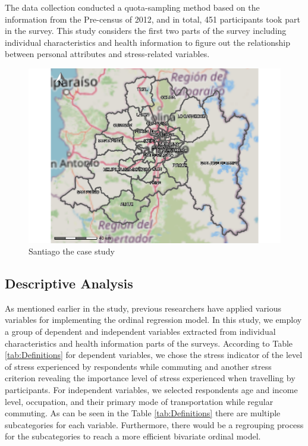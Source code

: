 \documentclass[
11pt, %
oneside, %
english, %
singlespacing, %
]{macthesis} %
\begin{document}
The data collection conducted a quota-sampling method based on the information from the Pre-census of 2012, and in total, 451 participants took part in the survey. This study considers the first two parts of the survey including individual characteristics and health information to figure out the relationship between personal attributes and stress-related variables.
\begin{figure}

{\centering \includegraphics[width=0.85\linewidth]{thesis_files/figure-latex/unnamed-chunk-21-1} 

}

\caption{\label{fig:study boundaries}Santiago the case study}\label{fig:unnamed-chunk-21}
\end{figure}
\hypertarget{descriptive-analysis}{%
\subsection{Descriptive Analysis}\label{descriptive-analysis}}

As mentioned earlier in the study, previous researchers have applied various variables for implementing the ordinal regression model. In this study, we employ a group of dependent and independent variables extracted from individual characteristics and health information parts of the surveys. According to Table \ref{tab:Definitions} for dependent variables, we chose the stress indicator of the level of stress experienced by respondents while commuting and another stress criterion revealing the importance level of stress experienced when travelling by participants. For independent variables, we selected respondents age and income level, occupation, and their primary mode of transportation while regular commuting. As can be seen in the Table \ref{tab:Definitions} there are multiple subcategories for each variable. Furthermore, there would be a regrouping process for the subcategories to reach a more efficient bivariate ordinal model.
\end{document}
